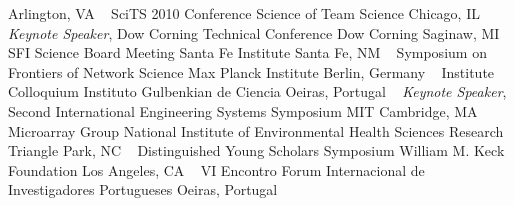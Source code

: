 Arlington, VA
\newline
~
\Gap
{}
SciTS 2010 Conference
\newline
    Science of Team Science
    \newline
Chicago, IL
\newline
~
\Gap
{}
\textit{Keynote Speaker}, Dow Corning Technical Conference
\newline
    Dow Corning
    \newline
Saginaw, MI
\newline
~
\Gap
{}
SFI Science Board Meeting
\newline
    Santa Fe Institute
    \newline
Santa Fe, NM
\newline
~
\Gap
{}
Symposium on Frontiers of Network Science
\newline
    Max Planck Institute
    \newline
Berlin, Germany
\newline
~
\Gap
{}
Institute Colloquium
\newline
    Instituto Gulbenkian de Ciencia
    \newline
Oeiras, Portugal
\newline
~
\Gap
{}
\textit{Keynote Speaker}, Second International Engineering Systems Symposium
\newline
    MIT
    \newline
Cambridge, MA
\newline
~
\Gap
{}
Microarray Group
\newline
    National Institute of Environmental Health Sciences
    \newline
Research Triangle Park, NC
\newline
~
\Gap
{}
Distinguished Young Scholars Symposium
\newline
    William M. Keck Foundation
    \newline
Los Angeles, CA
\newline
~
\Gap
{}
VI Encontro
\newline
    Forum Internacional de Investigadores Portugueses
    \newline
Oeiras, Portugal
\newline
